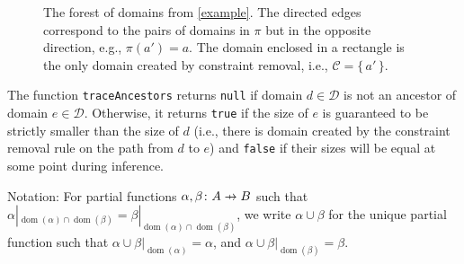 \documentclass{article}
\theoremstyle{definition}
\newcommand\pfun{\mathrel{\ooalign{\hfil$\mapstochar\mkern5mu$\hfil\cr$\to$\cr}}}
\DeclareMathOperator{\dom}{dom}
\begin{document}
\begin{figure}[t]
  \centering
  \caption{The forest of domains from \cref{example}. The directed edges correspond to the pairs of domains in $\pi$ but in the opposite direction, e.g., $\pi(a') = a$. The domain enclosed in a rectangle is the only domain created by constraint removal, i.e., $\mathscr{C} = \{\, a' \,\}$.}
  \label{fig:example}
\end{figure}

The function \texttt{traceAncestors} returns \texttt{null} if domain $d \in \mathscr{D}$ is not an ancestor of domain $e \in \mathscr{D}$. Otherwise, it returns \texttt{true} if the size of $e$ is guaranteed to be strictly smaller than the size of $d$ (i.e., there is domain created by the constraint removal rule on the path from $d$ to $e$) and \texttt{false} if their sizes will be equal at some point during inference.

Notation: For partial functions $\alpha, \beta\colon A \pfun B$ such that $\alpha|_{\dom(\alpha) \cap \dom(\beta)} = \beta|_{\dom(\alpha) \cap \dom(\beta)}$, we write $\alpha \cup \beta$ for the unique partial function such that $\alpha \cup \beta|_{\dom(\alpha)} = \alpha$, and $\alpha \cup \beta|_{\dom(\beta)} = \beta$.
\end{document}
